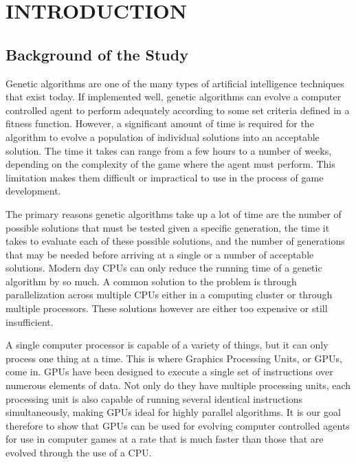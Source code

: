 \chapter{INTRODUCTION}

\section{Background of the Study}

Genetic algorithms are one of the many types of artificial intelligence
techniques that exist today. If implemented well, genetic algorithms can
evolve a computer controlled agent to perform adequately according to some
set criteria defined in a fitness function. However, a significant amount of 
time is required for the algorithm to evolve a population of individual solutions 
into an acceptable solution. The time it takes can range from a few hours to a number
of weeks, depending on the complexity of the game where the agent must perform.
This limitation makes them difficult or impractical to use in the process of
game development.

The primary reasons genetic algorithms take up a lot of time are the number of 
possible solutions that must be tested given a specific generation, the time it 
takes to evaluate each of these possible solutions, and the number of generations 
that may be needed before arriving at a single or a number of acceptable solutions. 
Modern day CPUs can only reduce
the running time of a genetic algorithm by so much. A common solution to the
problem is through parallelization across multiple CPUs either in a computing
cluster or through multiple processors. These solutions however are either
too expensive or still insufficient.


A single computer processor is capable of a variety of things, but it can only process
one thing at a time. This is where Graphics Processing Units, or GPUs, come in.
GPUs have been designed to execute a single set of instructions over numerous elements
of data. Not only do they have multiple processing units, each processing unit is also
capable of running several identical instructions simultaneously, making GPUs ideal
for highly parallel algorithms. It is our goal therefore to show that GPUs can be used
for evolving computer controlled agents for use in computer games at a rate that is much
faster than those that are evolved through the use of a CPU.


